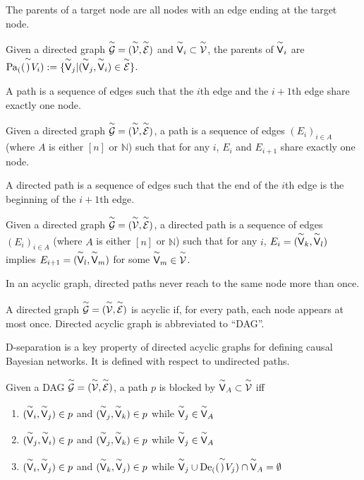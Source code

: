 The parents of a target node are all nodes with an edge ending at the target node.

\begin{definition}[Parents]
Given a directed graph $\overset{\sim}{\mathcal{G}}=(\overset{\sim}{\mathcal{V}},\overset{\sim}{\mathcal{E}})$ and $\overset{\sim}{\mathsf{V}}_i\subset \overset{\sim}{\mathcal{V}}$, the parents of $\overset{\sim}{\mathsf{V}}_i$ are $\text{Pa}_{(}(\overset{\sim}{\mathsf{)}}{V}_i):=\{\overset{\sim}{\mathsf{V}}_j|(\overset{\sim}{\mathsf{V}}_j,\overset{\sim}{\mathsf{V}}_i)\in\overset{\sim}{\mathcal{E}}\}$.
\end{definition}

A path is a sequence of edges such that the $i$th edge and the $i+1$th edge share exactly one node.

\begin{definition}[Path]
Given a directed graph $\overset{\sim}{\mathcal{G}}=(\overset{\sim}{\mathcal{V}},\overset{\sim}{\mathcal{E}})$, a path is a sequence of edges $(E_i)_{i\in A}$ (where $A$ is either $[n]$ or $\mathbb{N}$) such that for any $i$, $E_i$ and $E_{i+1}$ share exactly one node.
\end{definition}

A directed path is a sequence of edges such that the end of the $i$th edge is the beginning of the $i+1$th edge.

\begin{definition}
Given a directed graph $\overset{\sim}{\mathcal{G}}=(\overset{\sim}{\mathcal{V}},\overset{\sim}{\mathcal{E}})$, a directed path is a sequence of edges $(E_i)_{i\in A}$ (where $A$ is either $[n]$ or $\mathbb{N}$) such that for any $i$, $E_i=(\overset{\sim}{\mathsf{V}}_k,\overset{\sim}{\mathsf{V}}_l)$ implies $E_{i+1}=(\overset{\sim}{\mathsf{V}}_l,\overset{\sim}{\mathsf{V}}_m)$ for some $\overset{\sim}{\mathsf{V}}_m\in \overset{\sim}{\mathcal{V}}$.
\end{definition}

In an acyclic graph, directed paths never reach to the same node more than once.

\begin{definition}
A directed graph $\overset{\sim}{\mathcal{G}}=(\overset{\sim}{\mathcal{V}},\overset{\sim}{\mathcal{E}})$ is acyclic if, for every path, each node appears at most once. Directed acyclic graph is abbreviated to ``DAG''.
\end{definition}

D-separation is a key property of directed acyclic graphs for defining causal Bayesian networks. It is defined with respect to undirected paths.

\begin{definition}
Given a DAG $\overset{\sim}{\mathcal{G}}=(\overset{\sim}{\mathcal{V}},\overset{\sim}{\mathcal{E}})$, a path $p$ is blocked by $\overset{\sim}{\mathsf{V}}_A\subset\overset{\sim}{\mathcal{V}}$ iff
\begin{enumerate}
    \item $(\overset{\sim}{\mathsf{V}}_i,\overset{\sim}{\mathsf{V}}_j)\in p$ and $(\overset{\sim}{\mathsf{V}}_j,\overset{\sim}{\mathsf{V}}_k)\in p$ while $\overset{\sim}{\mathsf{V}}_j\in \overset{\sim}{\mathsf{V}}_A$
    \item $(\overset{\sim}{\mathsf{V}}_j,\overset{\sim}{\mathsf{V}}_i)\in p$ and $(\overset{\sim}{\mathsf{V}}_j,\overset{\sim}{\mathsf{V}}_k)\in p$ while $\overset{\sim}{\mathsf{V}}_j\in \overset{\sim}{\mathsf{V}}_A$
    \item $(\overset{\sim}{\mathsf{V}}_i,\overset{\sim}{\mathsf{V}}_j)\in p$ and $(\overset{\sim}{\mathsf{V}}_k,\overset{\sim}{\mathsf{V}}_j)\in p$ while $\overset{\sim}{\mathsf{V}}_j\cup \text{De}_{(}(\overset{\sim}{\mathsf{)}}{V}_j)\cap \overset{\sim}{\mathsf{V}}_A=\emptyset$
\end{enumerate}
\end{definition}

